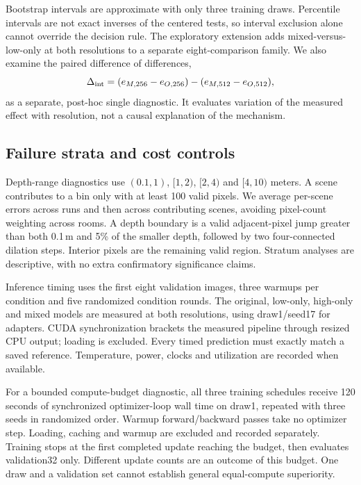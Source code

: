 \documentclass[10pt,twocolumn,letterpaper]{article}
\begin{document}
Bootstrap intervals are approximate with only three training draws. Percentile intervals are not exact inverses of the centered tests, so interval exclusion alone cannot override the decision rule. The exploratory extension adds mixed-versus-low-only at both resolutions to a separate eight-comparison family. We also examine the paired difference of differences,
\begin{equation}
\Delta_{\rm int}=(e_{M,256}-e_{O,256})-(e_{M,512}-e_{O,512}),
\end{equation}
as a separate, post-hoc single diagnostic. It evaluates variation of the measured effect with resolution, not a causal explanation of the mechanism.

\subsection{Failure strata and cost controls}
Depth-range diagnostics use $(0.1,1)$, $[1,2)$, $[2,4)$ and $[4,10)$ meters. A scene contributes to a bin only with at least 100 valid pixels. We average per-scene errors across runs and then across contributing scenes, avoiding pixel-count weighting across rooms. A depth boundary is a valid adjacent-pixel jump greater than both 0.1\,m and 5\% of the smaller depth, followed by two four-connected dilation steps. Interior pixels are the remaining valid region. Stratum analyses are descriptive, with no extra confirmatory significance claims.

Inference timing uses the first eight validation images, three warmups per condition and five randomized condition rounds. The original, low-only, high-only and mixed models are measured at both resolutions, using draw1/seed17 for adapters. CUDA synchronization brackets the measured pipeline through resized CPU output; loading is excluded. Every timed prediction must exactly match a saved reference. Temperature, power, clocks and utilization are recorded when available.

For a bounded compute-budget diagnostic, all three training schedules receive 120 seconds of synchronized optimizer-loop wall time on draw1, repeated with three seeds in randomized order. Warmup forward/backward passes take no optimizer step. Loading, caching and warmup are excluded and recorded separately. Training stops at the first completed update reaching the budget, then evaluates validation32 only. Different update counts are an outcome of this budget. One draw and a validation set cannot establish general equal-compute superiority.
\end{document}
